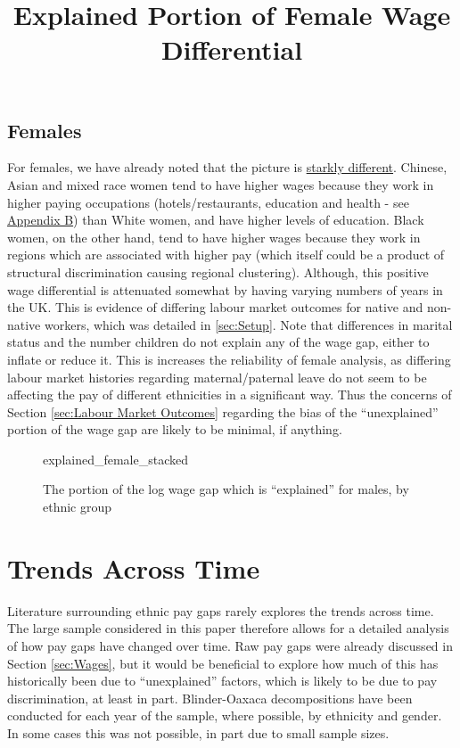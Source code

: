 \documentclass[class=article, crop=false]{standalone}
\begin{document}
\subsection{Females}
\label{sec:females_explained}
For females, we have already noted that the picture is \hyperref[sec:results]{starkly different}. Chinese, Asian and mixed race women tend to have higher wages because they work in higher paying occupations (hotels/restaurants, education and health - see \hyperref[sec:appendixB]{Appendix B}) than White women, and have higher levels of education. Black women, on the other hand, tend to have higher wages because they work in regions which are associated with higher pay (which itself could be a product of structural discrimination causing regional clustering). Although, this positive wage differential is attenuated somewhat by having varying numbers of years in the UK. This is evidence of differing labour market outcomes for native and non-native workers, which was detailed in \ref{sec:Setup}. Note that differences in marital status and the number children do not explain any of the wage gap, either to inflate or reduce it. This is increases the reliability of female analysis, as differing labour market histories regarding maternal/paternal leave do not seem to be affecting the pay of different ethnicities in a significant way. Thus the concerns of Section \ref{sec:Labour Market Outcomes} regarding the bias of the \enquote{unexplained} portion of the wage gap are likely to be minimal, if anything.

\begin{figure}[]
\centering
    \title{Explained Portion of Female Wage Differential}
    {explained_female_stacked}
    \caption{The portion of the log wage gap which is \enquote{explained} for males, by ethnic group}
    \label{fig:explained_female_stacked}
\end{figure}

\section{Trends Across Time}
\label{sec:time_trends}
Literature surrounding ethnic pay gaps rarely explores the trends across time. The large sample considered in this paper therefore allows for a detailed analysis of how pay gaps have changed over time. Raw pay gaps were already discussed in Section \ref{sec:Wages}, but it would be beneficial to explore how much of this has historically been due to \enquote{unexplained} factors, which is likely to be due to pay discrimination, at least in part. Blinder-Oaxaca decompositions have been conducted for each year of the sample, where possible, by ethnicity and gender. In some cases this was not possible, in part due to small sample sizes.
\end{document}
